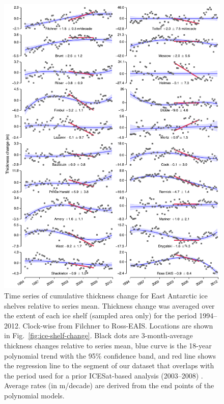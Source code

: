 \begin{figure}[!h]
  \centering
  \includegraphics[width=.95\textwidth]{img/Sup1_ts_shelves_eais_review_v7.png}
  \caption[Time series of cumulative thickness change for East]{
  \ssp \footnotesize
Time series of cumulative thickness change for East Antarctic ice shelves relative to series mean. Thickness change was averaged over the extent of each ice shelf (sampled area only) for the period 1994--2012. Clock-wise from Filchner to Ross-EAIS. Locations are shown in Fig.~\ref{fig:ice-shelf-change}. Black dots are 3-month-average thickness changes relative to series mean, blue curve is the 18-year polynomial trend with the 95\% confidence band, and red line shows the regression line to the segment of our dataset that overlaps with the period used for a prior ICESat-based analysis (2003--2008) \parencite{Pritchard2012}. Average rates (in m/decade) are derived from the end points of the polynomial models.
}
  \label{fig:ts-ice-shelves-east}
\end{figure}


